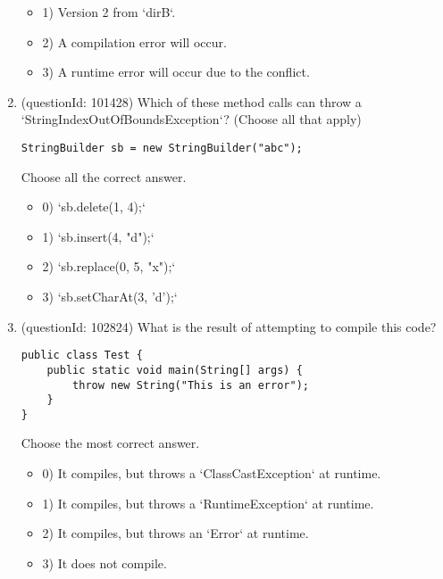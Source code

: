 \documentclass[12pt]{article}
\begin{document}
\begin{enumerate}[label=(\arabic*)]
\begin{itemize}
\item 1) Version 2 from `dirB`.

\item 2) A compilation error will occur.

\item 3) A runtime error will occur due to the conflict.

\end{itemize}
\item (questionId: 101428) Which of these method calls can throw a `StringIndexOutOfBoundsException`? (Choose all that apply)
\begin{verbatim}
StringBuilder sb = new StringBuilder("abc");
\end{verbatim}
Choose all the correct answer.\begin{itemize}
\item 0) `sb.delete(1, 4);`

\item 1) `sb.insert(4, "d");`

\item 2) `sb.replace(0, 5, "x");`

\item 3) `sb.setCharAt(3, 'd');`

\end{itemize}
\item (questionId: 102824) What is the result of attempting to compile this code?
\begin{verbatim}
public class Test {
    public static void main(String[] args) {
        throw new String("This is an error");
    }
}
\end{verbatim}
Choose the most correct answer. 
\begin{itemize}
\item 0) It compiles, but throws a `ClassCastException` at runtime.

\item 1) It compiles, but throws a `RuntimeException` at runtime.

\item 2) It compiles, but throws an `Error` at runtime.

\item 3) It does not compile.

\end{itemize}

\end{enumerate}
\end{document}
